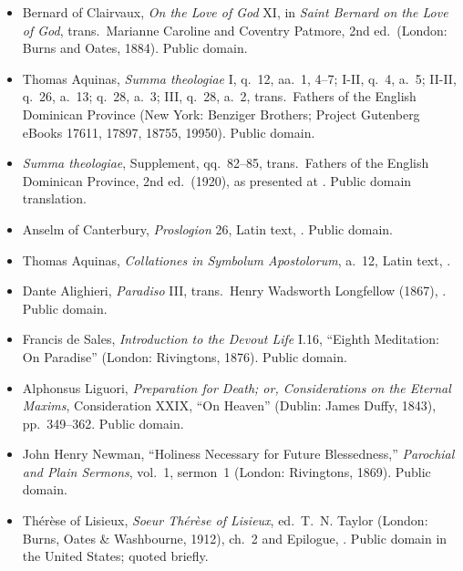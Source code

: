 {\fontsize{8.6}{9.6}\selectfont
\begin{itemize}[itemsep=0pt,parsep=0pt,topsep=0.05em]
\item Bernard of Clairvaux, \emph{On the Love of God} XI, in \emph{Saint Bernard on the Love of God}, trans.\ Marianne Caroline and Coventry Patmore, 2nd ed.\ (London: Burns and Oates, 1884). Public domain.
\item Thomas Aquinas, \emph{Summa theologiae} I, q.~12, aa.~1, 4--7; I-II, q.~4, a.~5; II-II, q.~26, a.~13; q.~28, a.~3; III, q.~28, a.~2, trans.\ Fathers of the English Dominican Province (New York: Benziger Brothers; Project Gutenberg eBooks 17611, 17897, 18755, 19950). Public domain.
\item \emph{Summa theologiae}, Supplement, qq.~82--85, trans.\ Fathers of the English Dominican Province, 2nd ed.\ (1920), as presented at . Public domain translation.
\item Anselm of Canterbury, \emph{Proslogion} 26, Latin text, . Public domain.
\item Thomas Aquinas, \emph{Collationes in Symbolum Apostolorum}, a.~12, Latin text, .
\item Dante Alighieri, \emph{Paradiso} III, trans.\ Henry Wadsworth Longfellow (1867), . Public domain.
\item Francis de Sales, \emph{Introduction to the Devout Life} I.16, ``Eighth Meditation: On Paradise'' (London: Rivingtons, 1876). Public domain.
\item Alphonsus Liguori, \emph{Preparation for Death; or, Considerations on the Eternal Maxims}, Consideration XXIX, ``On Heaven'' (Dublin: James Duffy, 1843), pp.~349--362. Public domain.
\item John Henry Newman, ``Holiness Necessary for Future Blessedness,'' \emph{Parochial and Plain Sermons}, vol.~1, sermon~1 (London: Rivingtons, 1869). Public domain.
\item Thérèse of Lisieux, \emph{Soeur Thérèse of Lisieux}, ed.\ T.~N. Taylor (London: Burns, Oates \& Washbourne, 1912), ch.~2 and Epilogue, . Public domain in the United States; quoted briefly.
\end{itemize}}
\endgroup
